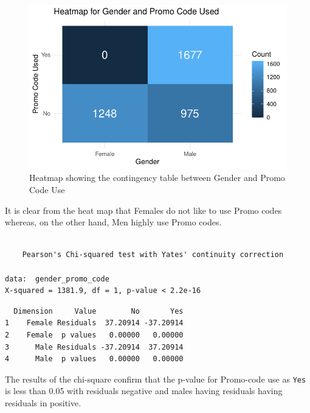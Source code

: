 \documentclass[
  letterpaper,
  DIV=11,
  numbers=noendperiod]{scrartcl}
\begin{document}
\begin{figure}[H]

{\centering \includegraphics{Customer_Preference_Analytics_files/figure-pdf/unnamed-chunk-32-1.pdf}

}

\caption{Heatmap showing the contingency table between Gender and Promo
Code Use}

\end{figure}%

It is clear from the heat map that Females do not like to use Promo
codes whereas, on the other hand, Men highly use Promo codes.

\begin{verbatim}

    Pearson's Chi-squared test with Yates' continuity correction

data:  gender_promo_code
X-squared = 1381.9, df = 1, p-value < 2.2e-16
\end{verbatim}

\begin{verbatim}
  Dimension     Value        No       Yes
1    Female Residuals  37.20914 -37.20914
2    Female  p values   0.00000   0.00000
3      Male Residuals -37.20914  37.20914
4      Male  p values   0.00000   0.00000
\end{verbatim}

The results of the chi-square confirm that the p-value for Promo-code
use as \texttt{Yes} is less than 0.05 with residuals negative and males
having residuals having residuals in positive.
\end{document}
